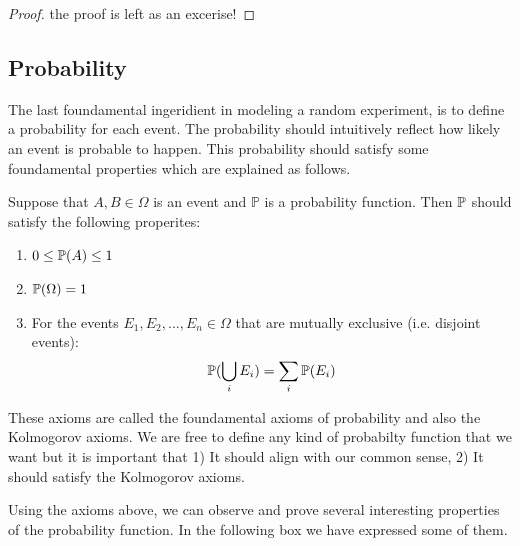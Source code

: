 \begin{proof}
	the proof is left as an excerise!
\end{proof}


\subsection{Probability}

The last foundamental ingeridient in modeling a random experiment, is to define a probability for each event. The probability should intuitively reflect how likely an event is probable to happen. This probability should satisfy some foundamental properties which are explained as follows.

\begin{definition}
	
	Suppose that $A, B \in \Omega$ is an event and $\mathbb{P}$ is a probability function. Then $\mathbb{P}$ should satisfy the following properites:
	
	\begin{enumerate}
		
		\item $ 0 \leq \mathbb{P}(A) \leq 1$
		\item $\mathbb{P}(\Omega) = 1$
		\item For the events $E_1, E_2, ..., E_n \in \Omega$ that are mutually exclusive (i.e. disjoint events): $$\mathbb{P}(\bigcup_{i} E_i) = \sum_i \mathbb{P}(E_i)$$
	\end{enumerate}
	
	
\end{definition}



These axioms are called the foundamental axioms of probability and also the Kolmogorov axioms. We are free to define any kind of probabilty function that we want but it is important that 1) It should align with our common sense, 2) It should satisfy the Kolmogorov axioms. 

Using the axioms above, we can observe and prove several interesting properties of the probability function. In the following box we have expressed some of them.

